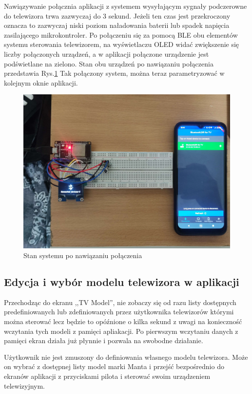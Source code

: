 \documentclass[12pt,twoside]{article}
\begin{document}
Nawiązywanie połącznia aplikacji z systemem wysyłającym sygnały podczerowne do telewizora trwa zazwyczaj do 3 sekund. Jeżeli ten czas jest przekroczony oznacza to zazwyczaj niski poziom naładowania baterii lub spadek napięcia zasilającego mikrokontroler. Po połączeniu się za pomocą BLE obu elementów systemu sterowania telewizorem, na wyświetlaczu OLED widać zwiększenie się liczby połączonych urządzeń, a w aplikacji połączone urządzenie jest podświetlane na zielono. Stan obu urządzeń po nawiązaniu połączenia przedstawia Rys.\ref*{Fig:connectingTest} Tak połączony system, można teraz parametryzować w kolejnym oknie aplikacji.
\begin{figure}[ht]
   \centering
   \includegraphics[width=14cm]{images/connectingTest.jpg}
   \caption{Stan systemu po nawiązaniu połączenia}
   \label{Fig:connectingTest}
\end{figure}

\subsection{Edycja i wybór modelu telewizora w aplikacji}
Przechodząc do ekranu ,,TV Model'', nie zobaczy się od razu listy dostępnych predefiniowanych lub zdefiniowanych przez użytkownika telewizorów którymi można sterować lecz będzie to opóźnione o kilka sekund z uwagi na konieczność wczytania tych modeli z pamięci apliakacji. Po pierwszym wczytaniu danych z pamięci ekran działa już płynnie i pozwala na swobodne działanie.

Użytkownik nie jest zmuszony do definiowania własnego modelu telewizora. Może on wybrać z dostępnej listy model marki Manta i przejść bezpośrednio do ekranów aplikacji z przyciskami pilota i sterować swoim urządzeniem telewizyjnym.
\end{document}
